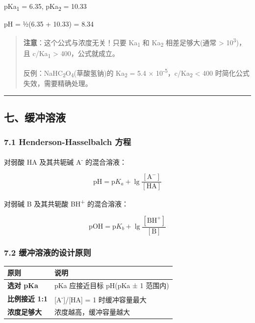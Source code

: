 pKa\textsubscript{1} = 6.35, pKa\textsubscript{2} = 10.33

pH = ½(6.35 + 10.33) = 8.34

\begin{quote}
\textbf{注意}：这个公式与浓度无关！只要 Ka\textsubscript{1} 和 Ka\textsubscript{2} 相差足够大(通常 \textgreater{} 10\textsuperscript{3})，且 c/Ka\textsubscript{1} \textgreater{} 400，公式就成立。

反例：NaHC\textsubscript{2}O\textsubscript{4}(草酸氢钠)的 Ka\textsubscript{2} = 5.4 × 10\textsuperscript{-5}，c/Ka\textsubscript{2} \textless{} 400 时简化公式失效，需要精确处理。
\end{quote}

\begin{center}\rule{0.5\linewidth}{0.5pt}\end{center}

\subsection{七、缓冲溶液}\label{ux4e03ux7f13ux51b2ux6eb6ux6db2}

\subsubsection{7.1 Henderson-Hasselbalch 方程}\label{henderson-hasselbalch-ux65b9ux7a0b}

对弱酸 HA 及其共轭碱 A\textsuperscript{-} 的混合溶液：

\[
\boxed{\mathrm{pH} = \mathrm{p}K_a + \lg\frac{[\mathrm{A^-}]}{[\mathrm{HA}]}}
\]

对弱碱 B 及其共轭酸 BH\textsuperscript{+} 的混合溶液：

\[
\mathrm{pOH} = \mathrm{p}K_b + \lg\frac{[\mathrm{BH^+}]}{[\mathrm{B}]}
\]

\subsubsection{7.2 缓冲溶液的设计原则}\label{ux7f13ux51b2ux6eb6ux6db2ux7684ux8bbeux8ba1ux539fux5219}

{\def\LTcaptype{none} %
\begin{longtable}[]{@{}ll@{}}
\toprule\noalign{}
原则 & 说明 \\
\midrule\noalign{}
\endhead
\bottomrule\noalign{}
\endlastfoot
\textbf{选对 pKa} & pKa 应接近目标 pH(pKa ± 1 范围内) \\
\textbf{比例接近 1:1} & {[}A\textsuperscript{-}{]}/{[}HA{]} = 1 时缓冲容量最大 \\
\textbf{浓度足够大} & 浓度越高，缓冲容量越大 \\
\end{longtable}
}

